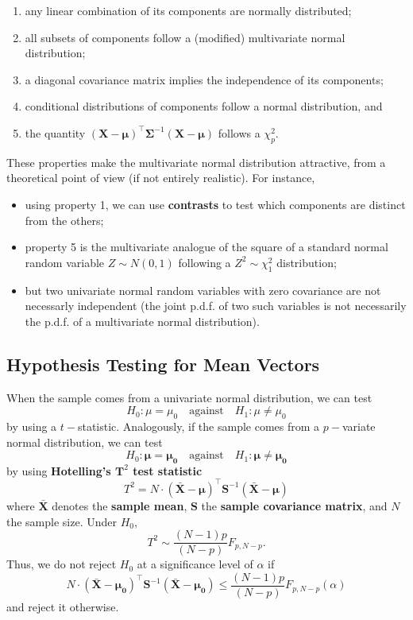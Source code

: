\begin{enumerate}[noitemsep]
    \item any linear combination of its components are normally distributed;
    \item all subsets of components follow a (modified) multivariate normal distribution;
    \item a diagonal covariance matrix implies the independence of its components;
    \item conditional distributions of components follow a normal distribution, and 
    \item the quantity $(\bm{X}-\bm{\mu})^{\!\top}\bm{\Sigma}^{-1}(\bm{X}-\bm{\mu})$ follows a $\chi^{2}_{p}$.
\end{enumerate}
These properties make the multivariate normal distribution attractive, from a theoretical point of view (if not entirely realistic). For instance, 
\begin{itemize}[noitemsep]
\item using property 1, we can use \textbf{contrasts} to test which components are distinct from the others; \item property 5 is the multivariate analogue of the square of a standard normal random variable $Z\sim N(0,1)$ following a $Z^2\sim \chi^2_1$ distribution;
\item but two univariate normal random variables with zero covariance are not necessarly independent (the joint p.d.f. of two such variables is not necessarily the p.d.f. of a multivariate normal distribution).
\end{itemize}
\subsection{Hypothesis Testing for Mean Vectors}
When the sample comes from a univariate normal distribution, we can test $$H_{0}: \mu=\mu_{0}\quad\mbox{against}\quad H_{1}: \mu \neq \mu_{0}$$ by using a $t-$statistic. Analogously, if the sample comes from a $p-$variate normal distribution, we can test $$H_{0}: \bm{\mu}=\bm{\mu_{0}}\quad\mbox{against}\quad H_{1}: \bm{\mu} \neq \bm{\mu_{0}}$$ by using \textbf{Hotelling's $\bm{T}^2$ test statistic}
$$
    T^{2}=N\cdot (\bm{\bar{X}}-\bm{\mu})^{\!\top}\bm{S}^{-1}(\bm{\bar{X}}-\bm{\mu})
$$
where $\bm{\bar{X}}$ denotes the \textbf{sample mean}, $\bm{S}$ the \textbf{sample covariance matrix}, and $N$ the sample size. \newl  
Under $H_{0}$, $$T^{2}\sim \frac{(N-1)p}{(N-p)}F_{p, N-p}.$$ Thus, we do not reject $H_{0}$ at a significance level of $\alpha$ if 
$$
    N\cdot (\bm{\bar{X}}-\bm{\mu_{0}})^{\!\top}\bm{S}^{-1}(\bm{\bar{X}}-\bm{\mu_{0}}) \leq \frac{(N-1)p}{(N-p)}F_{p, N-p}(\alpha)
$$
and reject it otherwise.
